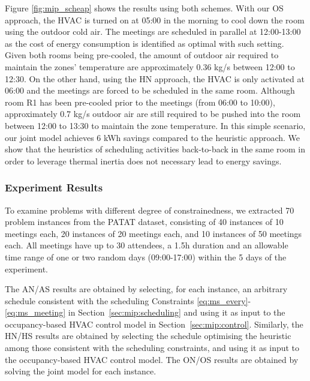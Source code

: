 Figure \ref{fig:mip_scheap} shows the results using both schemes. With our OS approach, the HVAC is turned on at 05:00 in the morning to cool down the room using the outdoor cold air. The meetings are scheduled in parallel at 12:00-13:00 as the cost of energy consumption is identified as optimal with such setting. Given both rooms being pre-cooled, the amount of outdoor air required to maintain the zones' temperature are approximately 0.36 kg/s between 12:00 to 12:30. On the other hand, using the HN approach, the HVAC is only activated at 06:00 and the meetings are forced to be scheduled in the same room. Although room R1 has been pre-cooled prior to the meetings (from 06:00 to 10:00), approximately 0.7 kg/s outdoor air are still required to be pushed into the room between 12:00 to 13:30 to maintain the zone temperature. In this simple scenario, our joint model achieves 6 kWh savings compared to the heuristic approach. We show that the heuristics of scheduling activities back-to-back in the same room in order to leverage thermal inertia does not necessary lead to energy savings.


\subsubsection{Experiment Results} 

To examine problems with different degree of constrainedness, we extracted 70 problem instances from the PATAT dataset, consisting of 
40 instances of 10 meetings each, 20 instances of 20 meetings each, and 10 instances of 50 meetings each. All meetings have up to 30 attendees, a 1.5h duration and an allowable time range of one or two random days (09:00-17:00) within the 5 days of the experiment.

The AN/AS results are obtained by selecting, for each instance, an arbitrary schedule consistent with the scheduling Constraints \eqref{eq:ms_every}-\eqref{eq:ms_meeting} in Section~\ref{sec:mip:scheduling} and using it as input to the occupancy-based HVAC control model in Section~\ref{sec:mip:control}. Similarly, the HN/HS results are obtained by selecting the schedule optimising the heuristic among those consistent with the scheduling constraints, and using it as input to the occupancy-based HVAC control model. The ON/OS results are obtained by solving the joint model for each instance.


